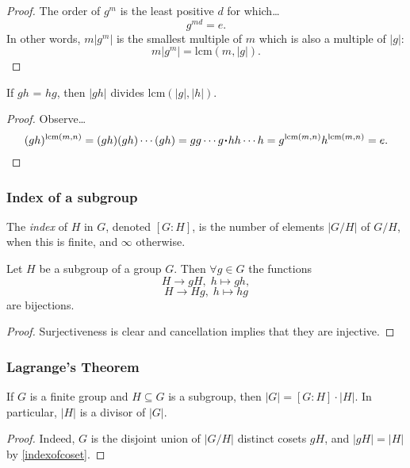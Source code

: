 \begin{proof}
The order of $g^m$ is the least positive $d$ for which\dots
$$g^{md} = e.$$
In other words, $m|g^m|$ is the smallest multiple of $m$ which is also a multiple of $|g|$:
$$m|g^m| = \textrm{lcm}(m,|g|).$$
\end{proof}

\begin{proposition}
If $gh$ = $hg$, then $|gh|$ divides lcm$(|g|,|h|)$.
\end{proposition}

\begin{proof}
Observe\dots
$$(gh)^{\textrm{lcm}(m,n)} = (gh)(gh)\cdots(gh) = gg\cdots g \LargerCdot hh\cdots h = g^{\textrm{lcm}(m,n)}h^{\textrm{lcm}(m,n)} = e.$$
\end{proof}

\subsubsection{Index of a subgroup}\label{subgroupindex}
The \emph{index} of $H$ in $G$, denoted $[G:H]$, is the number of elements $|G/H|$ of $G/H$, when this is finite, and $\infty$ otherwise.

\begin{lemma}
\label{indexofcoset}
Let $H$ be a subgroup of a group $G$. Then $\forall g \in G$ the functions
$$H \rightarrow gH, \; h \mapsto gh,$$
$$H \rightarrow Hg, \; h \mapsto hg$$
are bijections.
\end{lemma}

\begin{proof}
Surjectiveness is clear and cancellation implies that they are injective.
\end{proof}

\subsubsection{Lagrange's Theorem}

\begin{corollary}
\label{lagrangesthm}
If $G$ is a finite group and $H \subseteq G$ is a subgroup, then $|G| = [G : H] \cdot |H|$. In particular, $|H|$ is a divisor of $|G|$.
\end{corollary}

\begin{proof}
Indeed, $G$ is the disjoint union of $|G/H|$ distinct cosets $gH$, and $|gH| = |H|$ by \ref{indexofcoset}.
\end{proof}


